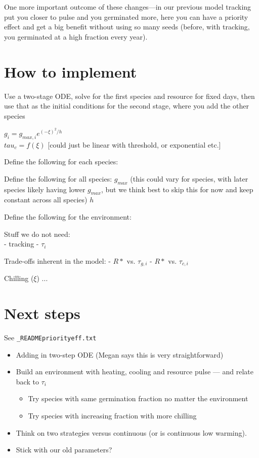 \documentclass[11pt,letter]{article}
\begin{document}
One more important outcome of these changes---in our previous model tracking put you closer to pulse and you germinated more, here you can have a priority effect and get a big benefit without using so many seeds (before, with tracking, you germinated at a high fraction every year). \\

\section{How to implement} 



Use a two-stage ODE, solve for the first species and resource for fixed days, then use that as the initial conditions for the second stage, where you add the other species 


$g_i = g_{max, i}e^{(-\xi)^2/h}$\\
$tau_c = f(\xi)$ [could just be linear with threshold, or exponential etc.]


Define the following for each species:


Define the following for all species:
$g_{max}$ (this could vary for species, with later species likely having lower $g_{max}$, but we think best to skip this for now and keep constant across all species) 
$h$

Define the following for the environment:



Stuff we do not need:\\
- tracking
- $\tau_i$

Trade-offs inherent in the model:
- $R*$ vs. $\tau_{g,i}$
- $R*$ vs. $\tau_{c,i}$

Chilling ($\xi$) ... 



\section{Next steps}

See \verb|_READMEpriorityeff.txt|

\begin{itemize}
\item Adding in two-step ODE (Megan says this is very straightforward)
\item  Build an environment with heating, cooling and resource pulse — and relate back to $\tau_i$
\begin{itemize}
\item Try species with same germination fraction no matter the environment
\item Try species with increasing fraction with more chilling 
\end{itemize}
\item Think on two strategies versus continuous (or is continuous low warming).
\item Stick with our old parameters? 
\end{itemize}
\end{document}
